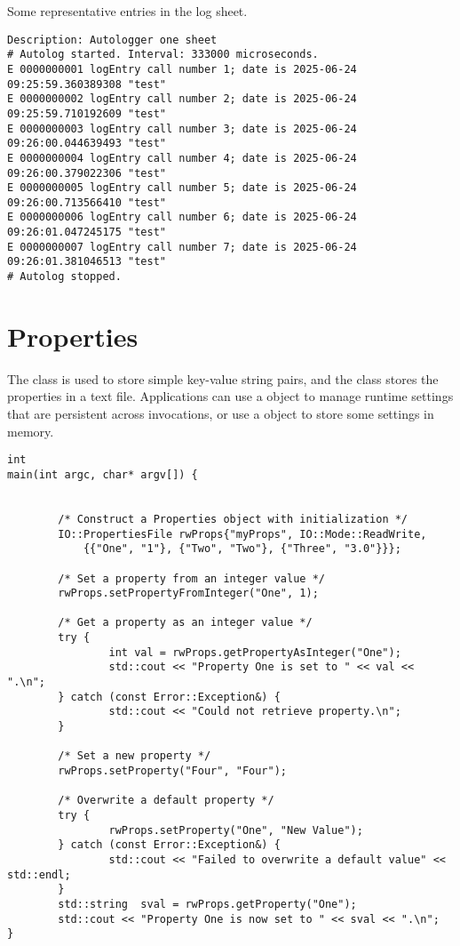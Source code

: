 Some representative entries in the log sheet.

\begin{verbatim}
Description: Autologger one sheet
# Autolog started. Interval: 333000 microseconds.
E 0000000001 logEntry call number 1; date is 2025-06-24 09:25:59.360389308 "test"
E 0000000002 logEntry call number 2; date is 2025-06-24 09:25:59.710192609 "test"
E 0000000003 logEntry call number 3; date is 2025-06-24 09:26:00.044639493 "test"
E 0000000004 logEntry call number 4; date is 2025-06-24 09:26:00.379022306 "test"
E 0000000005 logEntry call number 5; date is 2025-06-24 09:26:00.713566410 "test"
E 0000000006 logEntry call number 6; date is 2025-06-24 09:26:01.047245175 "test"
E 0000000007 logEntry call number 7; date is 2025-06-24 09:26:01.381046513 "test"
# Autolog stopped. 
\end{verbatim}

\section{Properties}
\label{sec-properties}
The  class is used to store simple key-value string pairs, 
and the  class stores the properties in a text file.
Applications can use a  object to manage
runtime settings that are persistent across invocations, or use a 
 object to store some settings in memory.

\begin{lstlisting}[caption={Using a \class{PropertiesFile} Object}, label=lst:propertiesuse]
int
main(int argc, char* argv[]) {


        /* Construct a Properties object with initialization */
        IO::PropertiesFile rwProps{"myProps", IO::Mode::ReadWrite,
            {{"One", "1"}, {"Two", "Two"}, {"Three", "3.0"}}};

        /* Set a property from an integer value */
        rwProps.setPropertyFromInteger("One", 1);

        /* Get a property as an integer value */
        try {
                int val = rwProps.getPropertyAsInteger("One");
                std::cout << "Property One is set to " << val << ".\n";
        } catch (const Error::Exception&) {
                std::cout << "Could not retrieve property.\n";
        }

        /* Set a new property */
        rwProps.setProperty("Four", "Four");

        /* Overwrite a default property */
        try {
                rwProps.setProperty("One", "New Value");
        } catch (const Error::Exception&) {
                std::cout << "Failed to overwrite a default value" << std::endl;
        }
        std::string  sval = rwProps.getProperty("One");
        std::cout << "Property One is now set to " << sval << ".\n";
}
\end{lstlisting}

